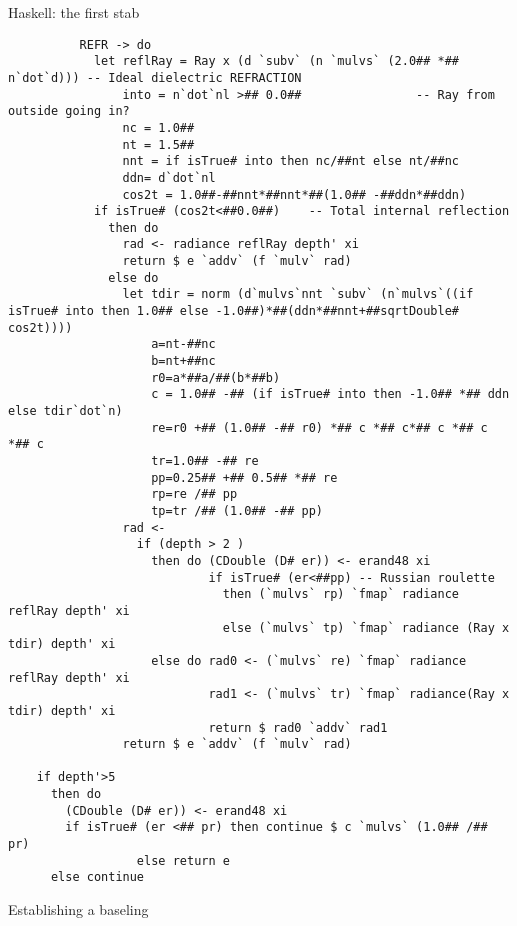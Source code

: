 \documentclass[8pt]{beamer}
\begin{document}
\begin{frame}[fragile]{Haskell: the first stab}
{\begin{verbatim}
          REFR -> do
            let reflRay = Ray x (d `subv` (n `mulvs` (2.0## *## n`dot`d))) -- Ideal dielectric REFRACTION
                into = n`dot`nl >## 0.0##                -- Ray from outside going in?
                nc = 1.0##
                nt = 1.5##
                nnt = if isTrue# into then nc/##nt else nt/##nc
                ddn= d`dot`nl
                cos2t = 1.0##-##nnt*##nnt*##(1.0## -##ddn*##ddn)
            if isTrue# (cos2t<##0.0##)    -- Total internal reflection
              then do
                rad <- radiance reflRay depth' xi
                return $ e `addv` (f `mulv` rad)
              else do
                let tdir = norm (d`mulvs`nnt `subv` (n`mulvs`((if isTrue# into then 1.0## else -1.0##)*##(ddn*##nnt+##sqrtDouble# cos2t))))
                    a=nt-##nc
                    b=nt+##nc
                    r0=a*##a/##(b*##b)
                    c = 1.0## -## (if isTrue# into then -1.0## *## ddn else tdir`dot`n)
                    re=r0 +## (1.0## -## r0) *## c *## c*## c *## c *## c 
                    tr=1.0## -## re
                    pp=0.25## +## 0.5## *## re
                    rp=re /## pp
                    tp=tr /## (1.0## -## pp)
                rad <-
                  if (depth > 2 )
                    then do (CDouble (D# er)) <- erand48 xi
                            if isTrue# (er<##pp) -- Russian roulette
                              then (`mulvs` rp) `fmap` radiance reflRay depth' xi
                              else (`mulvs` tp) `fmap` radiance (Ray x tdir) depth' xi
                    else do rad0 <- (`mulvs` re) `fmap` radiance reflRay depth' xi
                            rad1 <- (`mulvs` tr) `fmap` radiance(Ray x tdir) depth' xi
                            return $ rad0 `addv` rad1
                return $ e `addv` (f `mulv` rad)

    if depth'>5
      then do
        (CDouble (D# er)) <- erand48 xi
        if isTrue# (er <## pr) then continue $ c `mulvs` (1.0## /## pr)
                  else return e
      else continue 
\end{verbatim}
}
\end{frame}


\begin{frame}[fragile]{Establishing a baseling}
{\tiny
\begin{verbatim}
\end{verbatim}
}
\begin{itemize}
\end{itemize}
\end{frame}
\end{document}
